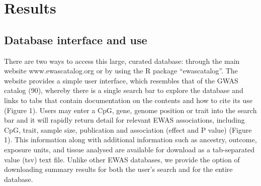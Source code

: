 \documentclass[11pt,oneside]{bristolthesis}
\begin{document}
\hypertarget{results-03}{%
\section{Results}\label{results-03}}

\hypertarget{database-interface-and-use}{%
\subsection{Database interface and use}\label{database-interface-and-use}}

There are two ways to access this large, curated database: through the main website www.ewascatalog.org or by using the R package ``ewascatalog''. The website provides a simple user interface, which resembles that of the GWAS catalog (90), whereby there is a single search bar to explore the database and links to tabs that contain documentation on the contents and how to cite its use (Figure 1). Users may enter a CpG, gene, genome position or trait into the search bar and it will rapidly return detail for relevant EWAS associations, including CpG, trait, sample size, publication and association (effect and P value) (Figure 1). This information along with additional information such as ancestry, outcome, exposure units, and tissue analysed are available for download as a tab-separated value (tsv) text file. Unlike other EWAS databases, we provide the option of downloading summary results for both the user's search and for the entire database.
\end{document}
